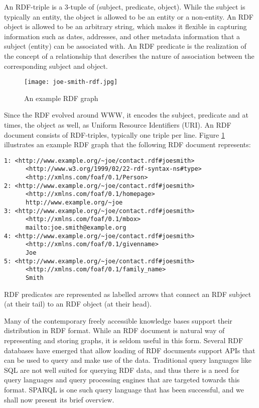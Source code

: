 An RDF-triple is a 3-tuple of (subject, predicate, object). While the subject is typically an entity, the object is allowed to be an entity or a non-entity. An RDF object is allowed to be an arbitrary string, which makes it flexible in capturing information such as dates, addresses, and other metadata information that a subject (entity) can be associated with. An RDF predicate is the realization of the concept of a relationship that describes the nature of association between the corresponding subject and object.

\begin{figure}[h!]
  \texttt{[image: joe-smith-rdf.jpg]}
  \caption{An example RDF graph}
  \label{fig:rdfexample}
\end{figure}


Since the RDF evolved around WWW, it encodes the subject, predicate and at times, the object as well, as Uniform Resource Identifiers (URI). An RDF document consists of RDF-triples, typically one triple per line. Figure \ref{fig:rdfexample} illustrates an example RDF graph that the following RDF document represents:

\begin{verbatim}
1: <http://www.example.org/~joe/contact.rdf#joesmith>
      <http://www.w3.org/1999/02/22-rdf-syntax-ns#type>  
      <http://xmlns.com/foaf/0.1/Person>
2: <http://www.example.org/~joe/contact.rdf#joesmith>   
      <http://xmlns.com/foaf/0.1/homepage>
      http://www.example.org/~joe
3: <http://www.example.org/~joe/contact.rdf#joesmith>  
      <http://xmlns.com/foaf/0.1/mbox>
      mailto:joe.smith@example.org
4: <http://www.example.org/~joe/contact.rdf#joesmith>
      <http://xmlns.com/foaf/0.1/givenname>
      Joe
5: <http://www.example.org/~joe/contact.rdf#joesmith>  
      <http://xmlns.com/foaf/0.1/family_name>
      Smith
\end{verbatim}

RDF predicates are represented as labelled arrows that connect an RDF subject (at their tail) to an RDF object (at their head).

Many of the contemporary freely accessible knowledge bases support their distribution in RDF format. While an RDF document is natural way of representing and storing graphs, it is seldom useful in this form. Several RDF databases have emerged that allow loading of RDF documents support APIs that can be used to query and make use of the data. Traditional query languages like SQL are not well suited for querying RDF data, and thus there is a need for query languages and query processing engines that are targeted towards this format. SPARQL is one such query language that has been successful, and we shall now present its brief overview. 


